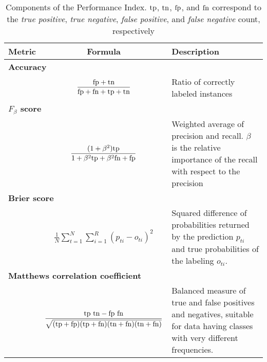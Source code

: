 	\begin{table}[here]
		\centering
		\begingroup
		\begin{tabularx}{\textwidth}{| l c X |}
			\hline
			Metric & Formula & Description \\
			\hline
			\multicolumn{3}{|l|}{\bf Accuracy}\\
			& $
				\begin{aligned}
					\frac {\mathrm{fp} + \mathrm{tn}} {\mathrm{fp} + \mathrm{fn} + \mathrm{tp} + \mathrm{tn}}
				\end{aligned}$
				& Ratio of correctly labeled instances\\
				\hline
			\multicolumn{3}{|l|}{\bf $F_\beta$ score}\\
			& $
				\begin{aligned}
					\frac {(1+\beta^2) \mathrm{tp}} {1+\beta^2 \mathrm{tp}+\beta^2 \mathrm{fn}+\mathrm{fp}}
				\end{aligned}
			$ & Weighted average of precision and recall. $\beta$ is the relative importance of the
			recall with respect to the precision\\
			\hline
			\multicolumn{3}{|l|}{\bf Brier score}\\
			& $
				\begin{aligned}
				\frac 1 N \sum_{t=1}^N \sum_{i=1}^R(p_{ti} - o_{ti})^2
				\end{aligned}
			$ & Squared difference of probabilities returned by the prediction $p_{ti}$ and true
			probabilities of the labeling $o_{ti}$.\\
			\hline
			\multicolumn{3}{|l|}{\bf Matthews correlation coefficient}\\
			& $
				\begin{aligned}
					\frac {\mathrm{tp}~\mathrm{tn} - \mathrm{fp}~\mathrm{fn}}
					{\sqrt{ (\mathrm{tp} + \mathrm{fp})(\mathrm{tp} + \mathrm{fn}) (\mathrm{tn} + \mathrm{fn}) (\mathrm{tn} + \mathrm{fn})}}
				\end{aligned}
			$ & Balanced measure of true and false positives and negatives, suitable for data
			having classes with very different frequencies.\\
			\hline
		\end{tabularx}
		\endgroup
		\caption[Components of the Performance Index]{Components of the Performance Index. $\mathrm{tp}$,
		$\mathrm{tn}$, $\mathrm{fp}$, and $\mathrm{fn}$ correspond to the \emph{true positive}, \emph{true negative},
		\emph{false positive}, and \emph{false
		negative} count, respectively}
		\label{tb:metrics}
	\end{table}

